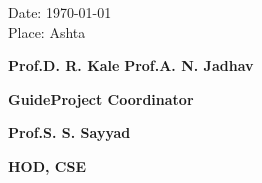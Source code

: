 \documentclass[english]{article}
\begin{document}
\vspace{20pt}

\begin{FlushLeft}
Date: \today 
\\
\vspace{20pt}
Place: Ashta
\end{FlushLeft}
\normalsize\textbf{Prof.D. R. Kale} \hfill\normalsize\textbf{Prof.A. N. Jadhav} 


	\hspace{1cm}\normalsize\textbf{Guide}\hfill   \normalsize\hspace{3cm}\textbf{Project Coordinator}

\hfill\break
\begin{center}

	\normalsize\textbf{Prof.S. S. Sayyad }

	\normalsize\textbf{HOD, CSE}
\end{center}

\clearpage %
\end{document}
